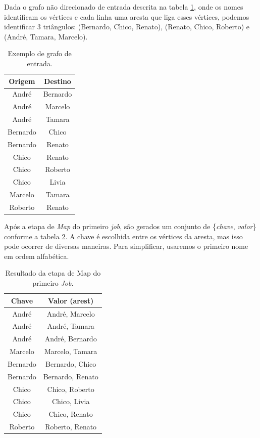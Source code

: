 Dada o grafo não direcionado de entrada descrita na tabela \ref{grafoExemplo}, onde os nomes identificam 
os vértices  e cada linha uma aresta que liga esses vértices, podemos identificar 3 triângulos: 
(Bernardo, Chico, Renato), (Renato, Chico, Roberto) e (André, Tamara, Marcelo).

\begin{table}[!htbp]
\centering
\caption{Exemplo de grafo de entrada.}
\label{grafoExemplo}
\begin{tabular}{|c|c|}
\hline
{\bf Origem} & {\bf Destino} \\ \hline
André        & Bernardo      \\ \hline
André        & Marcelo       \\ \hline
André        & Tamara        \\ \hline
Bernardo     & Chico         \\ \hline
Bernardo     & Renato        \\ \hline
Chico        & Renato        \\ \hline
Chico        & Roberto       \\ \hline
Chico        & Livia         \\ \hline
Marcelo      & Tamara        \\ \hline
Roberto      & Renato        \\ \hline      
\end{tabular}
\end{table}

Após a etapa de \textit{Map} do primeiro \textit{job}, são gerados um conjunto de 
\{\textit{chave}, \textit{valor}\} conforme a tabela \ref{map1}. A chave é escolhida entre os vértices 
da aresta, mas isso pode ocorrer de diversas maneiras. Para simplificar, usaremos o primeiro nome em ordem alfabética.

\begin{table}[!htbp]
\centering
\caption{Resultado da etapa de Map do primeiro \textit{Job}.}
\label{map1}
\begin{tabular}{|c|c|}

\hline
{\bf Chave} & {\bf Valor (arest)}      \\ \hline
André       & André, Marcelo   \\ \hline
André       & André, Tamara    \\ \hline
André       & André, Bernardo  \\ \hline
Marcelo     & Marcelo, Tamara  \\ \hline
Bernardo    & Bernardo, Chico  \\ \hline
Bernardo    & Bernardo, Renato \\ \hline
Chico       & Chico, Roberto   \\ \hline
Chico       & Chico, Livia     \\ \hline
Chico       & Chico, Renato    \\ \hline
Roberto     & Roberto, Renato  \\ \hline     
\end{tabular}
\end{table}

